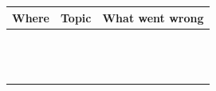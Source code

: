 \documentclass[11pt]{article}
\begin{document}
\begin{tabularx}{\textwidth}{
  >{\raggedright\arraybackslash}p{2.6cm}
  >{\raggedright\arraybackslash}p{3.2cm}
  X
}
\textbf{Where} & \textbf{Topic} & \textbf{What went wrong} \\
\hline
\\[-0.4em]

\underline{\hspace{2.4cm}} &
\underline{\hspace{3.0cm}} &
\underline{\hspace{9.3cm}}\\
\underline{\hspace{2.4cm}} & &
\underline{\hspace{9.3cm}}\\
\underline{\hspace{2.4cm}} & &
\underline{\hspace{9.3cm}}\\[0.5em]

\underline{\hspace{2.4cm}} &
\underline{\hspace{3.0cm}} &
\underline{\hspace{9.3cm}}\\
\underline{\hspace{2.4cm}} & &
\underline{\hspace{9.3cm}}\\
\underline{\hspace{2.4cm}} & &
\underline{\hspace{9.3cm}}\\[0.5em]

\underline{\hspace{2.4cm}} &
\underline{\hspace{3.0cm}} &
\underline{\hspace{9.3cm}}\\
\underline{\hspace{2.4cm}} & &
\underline{\hspace{9.3cm}}\\
\underline{\hspace{2.4cm}} & &
\underline{\hspace{9.3cm}}\\[0.5em]

\underline{\hspace{2.4cm}} &
\underline{\hspace{3.0cm}} &
\underline{\hspace{9.3cm}}\\
\underline{\hspace{2.4cm}} & &
\underline{\hspace{9.3cm}}\\
\underline{\hspace{2.4cm}} & &
\underline{\hspace{9.3cm}}\\[0.5em]


\end{tabularx}
\end{document}
